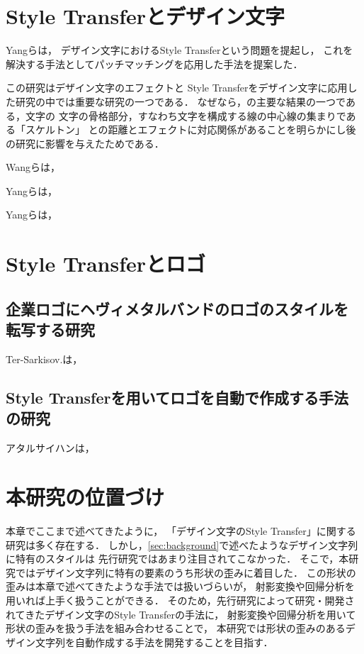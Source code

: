 \documentclass[\homedir/main.tex]{subfiles}
\begin{document}
\section{Style Transferとデザイン文字}\label{sec:text_effects_transfer}

Yangら\cite{Yang_2017_CVPR}は，
デザイン文字におけるStyle Transferという問題を提起し，
これを解決する手法としてパッチマッチングを応用した手法を提案した．

この研究はデザイン文字のエフェクトと
Style Transferをデザイン文字に応用した研究の中では重要な研究の一つである．
なぜなら，\cite{Yang_2017_CVPR}の主要な結果の一つである，文字の
文字の骨格部分，すなわち文字を構成する線の中心線の集まりである「スケルトン」
との距離とエフェクトに対応関係があることを明らかにし後の研究に影響を与えたためである．


Wangら\cite{typography2019}は，


Yangら\cite{Yang2019Controllable}は，

Yangら\cite{Yang2019TETGAN}は，

\section{Style Transferとロゴ}\label{sec:logo_style_transfer}%
\subsection{企業ロゴにヘヴィメタルバンドのロゴのスタイルを転写する研究}
Ter-Sarkisov.\cite{icpram20}は，

\subsection{Style Transferを用いてロゴを自動で作成する手法の研究}%
アタルサイハン\cite{Atarsaikhan}は，

\section{本研究の位置づけ}\label{sec:positioning}
本章でここまで述べてきたように，
「デザイン文字のStyle Transfer」に関する研究は多く存在する．
しかし，\cref{sec:background}で述べたようなデザイン文字列に特有のスタイルは
先行研究ではあまり注目されてこなかった．
そこで，本研究ではデザイン文字列に特有の要素のうち形状の歪みに着目した．
この形状の歪みは本章で述べてきたような手法では扱いづらいが，
射影変換や回帰分析を用いれば上手く扱うことができる．
そのため，先行研究によって研究・開発されてきたデザイン文字のStyle Transferの手法に，
射影変換や回帰分析を用いて形状の歪みを扱う手法を組み合わせることで，
本研究では形状の歪みのあるデザイン文字列を自動作成する手法を開発することを目指す．
\printBibForSubfiles
\end{document}
